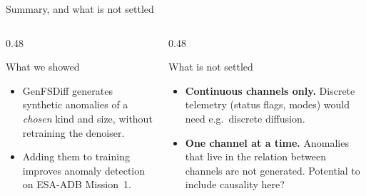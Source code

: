\documentclass[aspectratio=169,9pt,xcolor=table]{beamer}
\begin{document}
\begin{frame}{Summary, and what is not settled}

  \begin{columns}[T]
    \begin{column}{0.48\textwidth}
      \begin{eqbox}[good]{What we showed}
        \small
        \begin{itemize}\setlength\itemsep{0.4em}
          \item GenFSDiff generates synthetic anomalies of a
                \emph{chosen} kind and size, without retraining the denoiser.
          \item Adding them to training improves anomaly detection on
                ESA-ADB Mission~1.
        \end{itemize}
      \end{eqbox}
    \end{column}

    \begin{column}{0.48\textwidth}
      \begin{eqbox}[ink]{What is not settled}
        \small
        \begin{itemize}\setlength\itemsep{0.4em}
          \item \textbf{Continuous channels only.} Discrete telemetry
                (status flags, modes) would need e.g.\ discrete diffusion.
          \item \textbf{One channel at a time.} Anomalies that live in
                the relation between channels are not generated. Potential to include causality here?
        \end{itemize}
      \end{eqbox}
    \end{column}
  \end{columns}

\end{frame}
\end{document}
